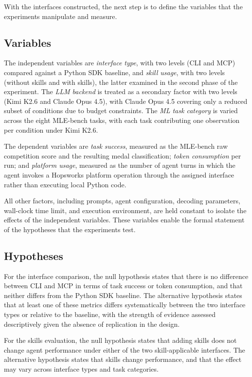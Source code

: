 \documentclass[
english,                 %
bibtex,                  %
includeExtraAbstracts, %
]{kththesis}
\numberwithin{listing}{chapter}
\begin{document}
With the interfaces constructed, the next step is to define the variables that the experiments manipulate and measure.

\subsection{Variables}

The independent variables are \emph{interface type}, with two levels (\gls{CLI} and \gls{MCP}) compared against a Python \gls{SDK} baseline, and \emph{skill usage}, with two levels (without skills and with skills), the latter examined in the second phase of the experiment. The \emph{\gls{LLM} backend} is treated as a secondary factor with two levels (Kimi K2.6 and Claude Opus 4.5), with Claude Opus 4.5 covering only a reduced subset of conditions due to budget constraints. The \emph{\gls{ML} task category} is varied across the eight \gls{MLE}-bench tasks, with each task contributing one observation per condition under Kimi K2.6.

The dependent variables are \emph{task success}, measured as the \gls{MLE}-bench raw competition score and the resulting medal classification; \emph{token consumption} per run; and \emph{platform usage}, measured as the number of agent turns in which the agent invokes a Hopsworks platform operation through the assigned interface rather than executing local Python code.

All other factors, including prompts, agent configuration, decoding parameters, wall-clock time limit, and execution environment, are held constant to isolate the effects of the independent variables. These variables enable the formal statement of the hypotheses that the experiments test.

\subsection{Hypotheses}

For the interface comparison, the null hypothesis states that there is no difference between \gls{CLI} and \gls{MCP} in terms of task success or token consumption, and that neither differs from the Python \gls{SDK} baseline. The alternative hypothesis states that at least one of these metrics differs systematically between the two interface types or relative to the baseline, with the strength of evidence assessed descriptively given the absence of replication in the design.

For the skills evaluation, the null hypothesis states that adding skills does not change agent performance under either of the two skill-applicable interfaces. The alternative hypothesis states that skills change performance, and that the effect may vary across interface types and task categories.
\end{document}
